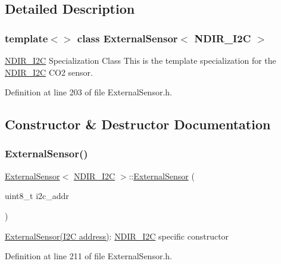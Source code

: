 \subsection{Detailed Description}
\subsubsection*{template$<$$>$\newline
class External\+Sensor$<$ N\+D\+I\+R\+\_\+\+I2\+C $>$}

\hyperlink{class_n_d_i_r___i2_c}{N\+D\+I\+R\+\_\+\+I2C} Specialization Class This is the template specialization for the \hyperlink{class_n_d_i_r___i2_c}{N\+D\+I\+R\+\_\+\+I2C} C\+O2 sensor. 

Definition at line 203 of file External\+Sensor.\+h.



\subsection{Constructor \& Destructor Documentation}
\mbox{\label{class_external_sensor_3_01_n_d_i_r___i2_c_01_4_aa06970ea689679c0e1deb5360e05a0a4}} 
\subsubsection{\texorpdfstring{External\+Sensor()}{ExternalSensor()}}
{\footnotesize\ttfamily \hyperlink{class_external_sensor}{External\+Sensor}$<$ \hyperlink{class_n_d_i_r___i2_c}{N\+D\+I\+R\+\_\+\+I2C} $>$\+::\hyperlink{class_external_sensor}{External\+Sensor} (\begin{DoxyParamCaption}\item[{uint8\+\_\+t}]{i2c\+\_\+addr }\end{DoxyParamCaption})\hspace{0.3cm}{\ttfamily [inline]}}

\hyperlink{class_external_sensor}{External\+Sensor(\+I2\+C address)}\+: \hyperlink{class_n_d_i_r___i2_c}{N\+D\+I\+R\+\_\+\+I2C} specific constructor 

Definition at line 211 of file External\+Sensor.\+h.


